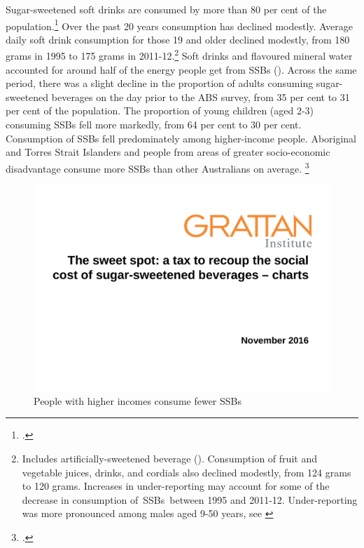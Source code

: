 \documentclass[embargoed]{grattan}
\begin{document}
Sugar-sweetened soft drinks are consumed by more than 80 per cent of the population.\footcite{Levy2014QuenchingAustraliasthirst} %
\CenturyFootnote  %
Over the past 20 years consumption has declined modestly. Average daily soft drink consumption for those 19 and older declined modestly, from 180 grams in 1995 to 175 grams in 2011-12.\footnote{Includes artificially-sweetened beverage (\textcites[][Table~5.1]{ABS20144364055007AustralianHealth}[][Table~1]{ABS199948040NationalNutrition}). Consumption of fruit and vegetable juices, drinks, and cordials also declined modestly, from 124 grams to 120 grams. Increases in under-reporting may account for some of the decrease in consumption of~SSBs~between 1995 and 2011-12. Under-reporting was more pronounced among males aged 9-50 years, see \textcite{ABS20144364055007AustralianHealth}} %
Soft drinks and flavoured mineral water accounted for around half of the energy people get from SSBs ().
Across the same period, there was a slight decline in the proportion of adults consuming sugar-sweetened beverages on the day prior to the ABS survey, from 35 per cent to 31 per cent of the population.
The proportion of young children (aged 2-3) consuming SSBs fell more markedly, from 64 per cent to 30 per cent.
Consumption of SSBs fell predominately among higher-income people.
Aboriginal and Torres Strait Islanders and people from areas of greater socio-economic disadvantage consume more SSBs than other Australians on average.%
\footcites[][Table~18]{ABS20144364055007AustralianHealth}{ABS199948040NationalNutrition}

\begin{figure}
\caption{People with higher incomes consume fewer SSBs}\label{fig:people-higher-incomes-consumer-fewer-SSBs}

\includegraphics[page=8]{atlas/ObesityCharts}


\end{figure}
\end{document}
